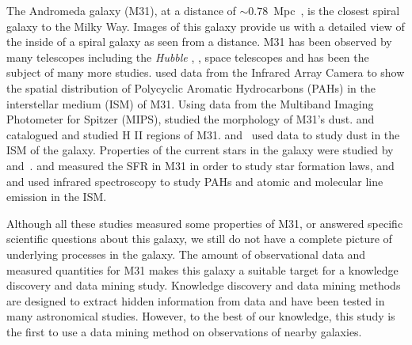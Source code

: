 The Andromeda galaxy (M31), at a distance of $\sim 0.78$~Mpc~\citep{McConnachie05}, is the closest spiral galaxy to the Milky Way.
Images of this galaxy provide us with a detailed view of the inside of a spiral galaxy as seen from a distance.
M31 has been observed by many telescopes including the {\it Hubble} \citep{Dalcanton12}, \Spitzer\citep{Wener04}, \Herschel\citep{Pilbratt10} space telescopes and has been the subject of many more studies. %
\cite{Barmby06} used data from the \Spitzer Infrared Array Camera \citep[IRAC;][]{Fazio04} to show the spatial distribution of Polycyclic Aromatic Hydrocarbons (PAHs) in the interstellar medium (ISM) of M31.
Using data from the Multiband Imaging Photometer for Spitzer (MIPS), \cite{Gordon06} studied the morphology of M31's dust.
\cite{Azimlu11} and \cite{Sanders12} catalogued and studied H {\sc II} regions of M31.
\cite{Draine14, Mattsson14, Viaene14, Smith12} and~\cite{Fritz12} used \Herschel data to study dust in the ISM of the galaxy.
Properties of the current stars in the galaxy were studied by~\cite{Tamm12} and~\cite{Massey07}. %
\cite{Rahmani16, Ford13} and \cite{Tabatabaei10} measured the SFR in M31 in order to study star formation laws, and \cite{Dim15} and \cite{Kapala15} used infrared spectroscopy to study PAHs and atomic and molecular line emission in the ISM.

Although all these studies measured some properties of M31, or answered specific scientific questions about this galaxy, we still do not have a complete picture of underlying processes in the galaxy.
The amount of observational data and measured quantities for M31 makes this galaxy a suitable target for a knowledge discovery and data mining study.
Knowledge discovery and data mining methods are designed to extract hidden information from data and have been tested in many astronomical studies.
However, to the best of our knowledge, this study is the first to use a data mining method on observations of nearby galaxies. %

